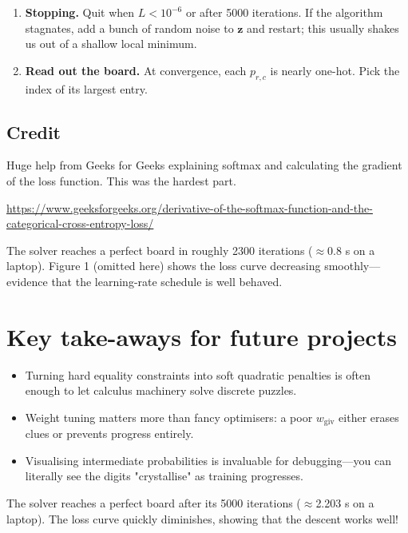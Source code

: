 \documentclass[12pt]{article}
\begin{document}
\begin{enumerate}
    \item \textbf{Stopping.} Quit when $L<10^{-6}$ or after 5000 iterations. If the
          algorithm stagnates, add a bunch of random noise to $\mathbf z$ and
          restart; this usually shakes us out of a shallow local minimum.
    
    \item \textbf{Read out the board.} At convergence, each $p_{r,c}$ is nearly
          one-hot. Pick the index of its largest entry.
\end{enumerate}

\subsection{Credit}
Huge help from Geeks for Geeks explaining softmax and calculating the gradient of the loss function. This was the hardest part. 

\url{https://www.geeksforgeeks.org/derivative-of-the-softmax-function-and-the-categorical-cross-entropy-loss/}

The solver reaches a perfect board in roughly 2300 iterations ($\approx$0.8 s on a
laptop). Figure 1 (omitted here) shows the loss curve decreasing smoothly—evidence
that the learning-rate schedule is well behaved.

\section*{Key take-aways for future projects}
\begin{itemize}
    \item Turning hard equality constraints into soft quadratic penalties is often
          enough to let calculus machinery solve discrete puzzles.
    \item Weight tuning matters more than fancy optimisers: a poor $w_{\text{giv}}$
          either erases clues or prevents progress entirely.
    \item Visualising intermediate probabilities is invaluable for debugging—you can
          literally see the digits "crystallise" as training progresses.
\end{itemize}

The solver reaches a perfect board after its 5000 iterations ($\approx$2.203 s on a
laptop). The loss curve quickly diminishes, showing that the descent works well!
\end{document}
